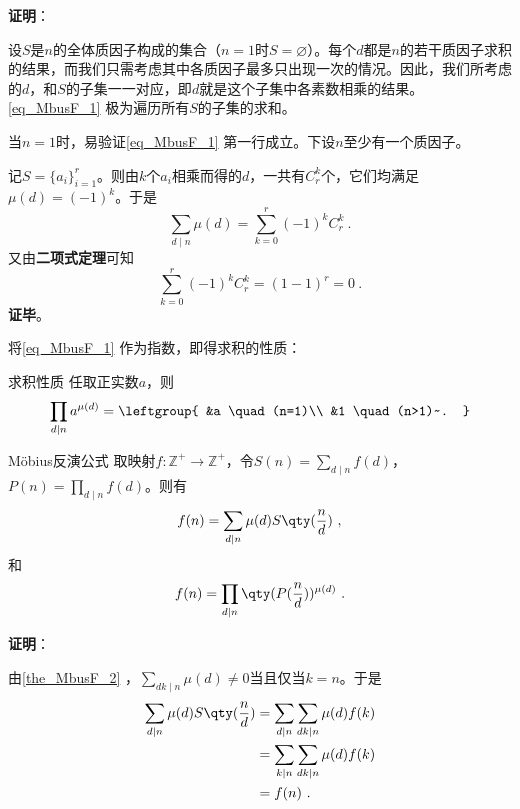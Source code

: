\textbf{证明}：

设$S$是$n$的全体质因子构成的集合（$n=1$时$S=\varnothing$）。每个$d$都是$n$的若干质因子求积的结果，而我们只需考虑其中各质因子最多只出现一次的情况。因此，我们所考虑的$d$，和$S$的子集一一对应，即$d$就是这个子集中各素数相乘的结果。\autoref{eq_MbusF_1} 极为遍历所有$S$的子集的求和。

当$n=1$时，易验证\autoref{eq_MbusF_1} 第一行成立。下设$n$至少有一个质因子。

记$S=\{a_i\}_{i=1}^r$。则由$k$个$a_i$相乘而得的$d$，一共有$C^k_r$个，它们均满足$\mu(d)=(-1)^k$。于是
\begin{equation}
\sum_{d\mid n}\mu(d)=\sum_{k=0}^r(-1)^kC^k_r~.
\end{equation}
又由\textbf{二项式定理}可知
\begin{equation}
\sum_{k=0}^r(-1)^kC^k_r=(1-1)^r=0~.
\end{equation}
\textbf{证毕}。

将\autoref{eq_MbusF_1} 作为指数，即得求积的性质：


\begin{corollary}{求积性质}\label{cor_MbusF_1}
任取正实数$a$，则
\begin{equation}
\prod_{d\mid n}a^{\mu(d)}=
\leftgroup{
    &a \quad (n=1)\\
    &1 \quad (n>1)~.
}
\end{equation}
\end{corollary}






\begin{theorem}{Möbius反演公式}\label{the_MbusF_3}
取映射$f:\mathbb{Z}^+\to\mathbb{Z}^+$，令$S(n)=\sum_{d\mid n}f(d)$，$P(n)=\prod_{d\mid n}f(d)$。则有
\begin{equation}
f(n) = \sum_{d\mid n}\mu(d)S\qty(\frac{n}{d})~,
\end{equation}
和
\begin{equation}
f(n) = \prod_{d\mid n}\qty(P(\frac{n}{d}))^{\mu(d)}~.
\end{equation}
\end{theorem}

\textbf{证明}：

由\autoref{the_MbusF_2} ，$\sum_{dk\mid n}\mu(d)\neq 0$当且仅当$k=n$。于是
\begin{equation}
\begin{aligned}
\sum_{d\mid n}\mu(d)S\qty(\frac{n}{d})&=\sum_{d\mid n}\sum_{dk\mid n}\mu(d)f(k)\\
&=\sum_{k\mid n}\sum_{dk\mid n}\mu(d)f(k)\\
&=f(n)~.
\end{aligned}
\end{equation}


